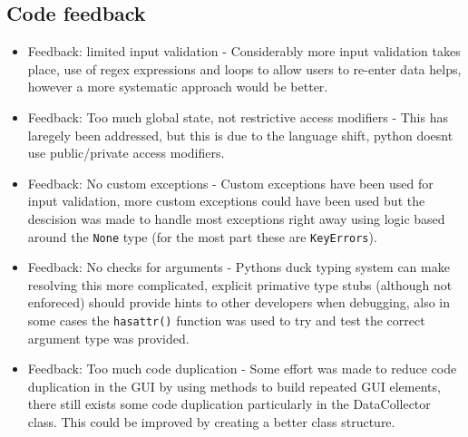 \documentclass[11pt]{article}
\newcommand{\code}[1]{\colorbox{light-gray}{\texttt{#1}}}
\begin{document}
\subsection{Code feedback}

\begin{itemize}
    \item Feedback: limited input validation - Considerably more input validation takes place, use of regex expressions and loops to allow users to re-enter data helps, however a more systematic approach would be better.
    \item Feedback: Too much global state, not restrictive access modifiers - This has laregely been addressed, but this is due to the language shift, python doesnt use public/private access modifiers.
    \item Feedback: No custom exceptions - Custom exceptions have been used for input validation, more custom exceptions could have been used but the descision was made to handle most exceptions right away using logic based around the \code{None} type (for the most part these are \code{KeyErrors}).
    \item Feedback: No checks for arguments - Pythons duck typing system can make resolving this more complicated, explicit primative type stubs (although not enforeced) should provide hints to other developers when debugging, also in some cases the \code{hasattr()} function was used to try and test the correct argument type was provided.
    \item Feedback: Too much code duplication - Some effort was made to reduce code duplication in the GUI by using methods to build repeated GUI elements, there still exists some code duplication particularly in the DataCollector class. This could be improved by creating a better class structure. 
\end{itemize}
\end{document}
